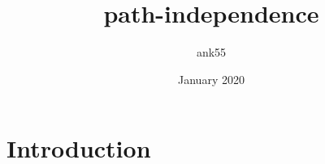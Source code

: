 \documentclass{article}
\title{path-independence}
\author{ank55 }
\date{January 2020}
\begin{document}
\maketitle

\section{Introduction}
\end{document}
